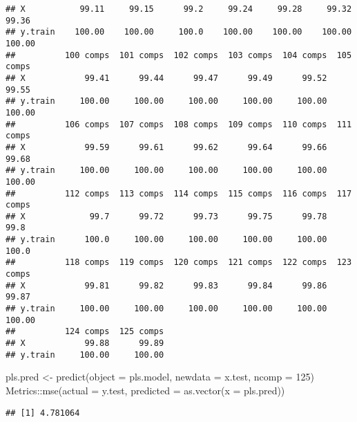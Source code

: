 \documentclass[
]{article}
\newenvironment{Shaded}{\begin{snugshade}}{\end{snugshade}}
\newcommand{\AttributeTok}[1]{\textcolor[rgb]{0.77,0.63,0.00}{#1}}
\newcommand{\DecValTok}[1]{\textcolor[rgb]{0.00,0.00,0.81}{#1}}
\newcommand{\FunctionTok}[1]{\textcolor[rgb]{0.00,0.00,0.00}{#1}}
\newcommand{\NormalTok}[1]{#1}
\newcommand{\OtherTok}[1]{\textcolor[rgb]{0.56,0.35,0.01}{#1}}
\newcommand{\SpecialCharTok}[1]{\textcolor[rgb]{0.00,0.00,0.00}{#1}}
\begin{document}
\begin{verbatim}
## X           99.11     99.15      99.2     99.24     99.28     99.32     99.36
## y.train    100.00    100.00     100.0    100.00    100.00    100.00    100.00
##          100 comps  101 comps  102 comps  103 comps  104 comps  105 comps
## X            99.41      99.44      99.47      99.49      99.52      99.55
## y.train     100.00     100.00     100.00     100.00     100.00     100.00
##          106 comps  107 comps  108 comps  109 comps  110 comps  111 comps
## X            99.59      99.61      99.62      99.64      99.66      99.68
## y.train     100.00     100.00     100.00     100.00     100.00     100.00
##          112 comps  113 comps  114 comps  115 comps  116 comps  117 comps
## X             99.7      99.72      99.73      99.75      99.78       99.8
## y.train      100.0     100.00     100.00     100.00     100.00      100.0
##          118 comps  119 comps  120 comps  121 comps  122 comps  123 comps
## X            99.81      99.82      99.83      99.84      99.86      99.87
## y.train     100.00     100.00     100.00     100.00     100.00     100.00
##          124 comps  125 comps
## X            99.88      99.89
## y.train     100.00     100.00
\end{verbatim}

\begin{Shaded}
\begin{Highlighting}[]
\NormalTok{pls.pred }\OtherTok{\textless{}{-}} \FunctionTok{predict}\NormalTok{(}\AttributeTok{object =}\NormalTok{ pls.model, }\AttributeTok{newdata =}\NormalTok{ x.test, }\AttributeTok{ncomp =} \DecValTok{125}\NormalTok{)}
\NormalTok{Metrics}\SpecialCharTok{::}\FunctionTok{mse}\NormalTok{(}\AttributeTok{actual =}\NormalTok{ y.test, }\AttributeTok{predicted =} \FunctionTok{as.vector}\NormalTok{(}\AttributeTok{x =}\NormalTok{ pls.pred))}
\end{Highlighting}
\end{Shaded}

\begin{verbatim}
## [1] 4.781064
\end{verbatim}
\end{document}
